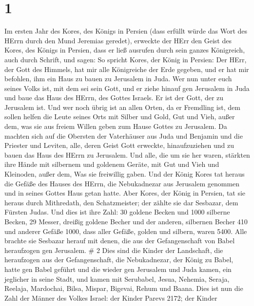 \hypertarget{section}{%
\section{1}\label{section}}

 Im ersten Jahr des Kores, des Königs in Persien (dass
erfüllt würde das Wort des HErrn durch den Mund Jeremias geredet),
erweckte der HErr den Geist des Kores, des Königs in Persien, dass er
ließ ausrufen durch sein ganzes Königreich, auch durch Schrift, und
sagen:  So spricht Kores, der König in Persien: Der HErr,
der Gott des Himmels, hat mir alle Königreiche der Erde gegeben, und er
hat mir befohlen, ihm ein Haus zu bauen zu Jerusalem in Juda.
 Wer nun unter euch seines Volks ist, mit dem sei sein Gott,
und er ziehe hinauf gen Jerusalem in Juda und baue das Haus des HErrn,
des Gottes Israels. Er ist der Gott, der zu Jerusalem ist. 
Und wer noch übrig ist an allen Orten, da er Fremdling ist, dem sollen
helfen die Leute seines Orts mit Silber und Gold, Gut und Vieh, außer
dem, was sie aus freiem Willen geben zum Hause Gottes zu Jerusalem.
 Da machten sich auf die Obersten der Vaterhäuser aus Juda
und Benjamin und die Priester und Leviten, alle, deren Geist Gott
erweckte, hinaufzuziehen und zu bauen das Haus des HErrn zu Jerusalem.
 Und alle, die um sie her waren, stärkten ihre Hände mit
silbernem und goldenem Geräte, mit Gut und Vieh und Kleinoden, außer
dem, Was sie freiwillig gaben.  Und der König Kores tat
heraus die Gefäße des Hauses des HErrn, die Nebukadnezar aus Jerusalem
genommen und in seines Gottes Haus getan hatte.  Aber Kores,
der König in Persien, tat sie heraus durch Mithredath, den
Schatzmeister; der zählte sie dar Sesbazar, dem Fürsten Judas.
 Und dies ist ihre Zahl: 30 goldene Becken und 1000 silberne
Becken, 29 Messer,  dreißig goldene Becher und der anderen,
silbernen Becher 410 und anderer Gefäße 1000,  dass aller
Gefäße, golden und silbern, waren 5400. Alle brachte sie Sesbazar herauf
mit denen, die aus der Gefangenschaft von Babel heraufzogen gen
Jerusalem. \# 2  Dies sind die Kinder der Landschaft, die
heraufzogen aus der Gefangenschaft, die Nebukadnezar, der König zu
Babel, hatte gen Babel geführt und die wieder gen Jerusalem und Juda
kamen, ein jeglicher in seine Stadt,  und kamen mit
Serubabel, Jesua, Nehemia, Seraja, Reelaja, Mardochai, Bilsa, Mispar,
Bigevai, Rehum und Baana. Dies ist nun die Zahl der Männer des Volkes
Israel:  der Kinder Parevs 2172;  der Kinder
